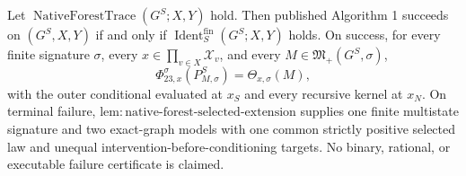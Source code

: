 Let \(\operatorname{NativeForestTrace}(G^S;X,Y)\) hold. Then published Algorithm 1 succeeds on \((G^S,X,Y)\) if and only if \(\operatorname{Ident}^{\mathrm{fin}}_S(G^S;X,Y)\) holds. On success, for every finite signature \(\sigma\), every \(x\in\prod_{v\in X}\mathcal X_v\), and every \(M\in\mathfrak M_+(G^S,\sigma)\),
\[
 \Phi_{23,x}^{\sigma}(P_{M,\sigma}^S)=\Theta_{x,\sigma}(M),
\]
with the outer conditional evaluated at \(x_S\) and every recursive kernel at \(x_N\). On terminal failure, \(\mathrm{lem:native\text{-}forest\text{-}selected\text{-}extension}\) supplies one finite multistate signature and two exact-graph models with one common strictly positive selected law and unequal intervention-before-conditioning targets. No binary, rational, or executable failure certificate is claimed.